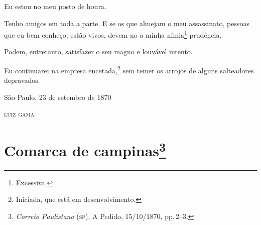 Eu estou no meu posto de honra.

Tenho amigos em toda a parte. E se os que almejam o meu assassinato,
pessoas que eu bem conheço, estão vivos, devem-no a minha
nímia\footnote{ Excessiva.} prudência.

Podem, entretanto, satisfazer o seu magno e louvável intento.

Eu continuarei na empresa encetada,\footnote{ Iniciada, que está em
  desenvolvimento.} sem temer os arrojos de alguns salteadores
depravados.

\begin{flushright}
São Paulo, 23 de setembro de 1870

\textsc{luiz gama}
\end{flushright}

\chapter{Comarca de campinas\footnote{\emph{Correio Paulistano} (\textsc{sp}), A Pedido, 15/10/1870,
  pp.\,2--3.}} %


